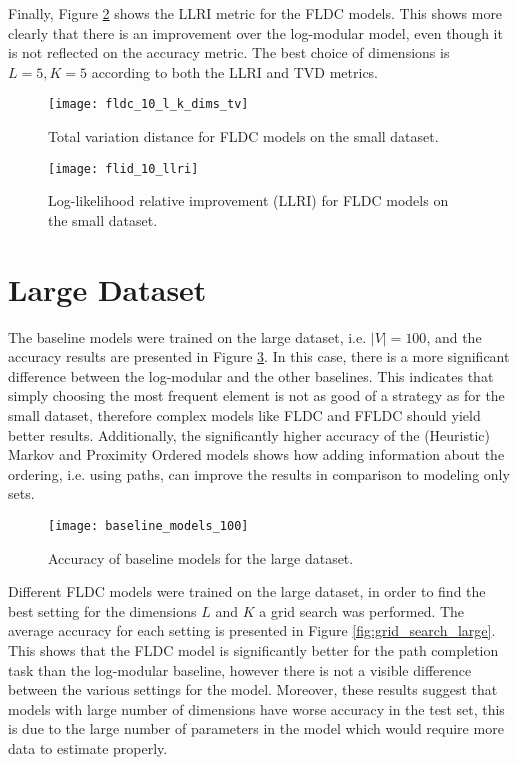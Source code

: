 Finally, Figure \ref{fig:small_llri} shows the LLRI metric for the FLDC models. This shows more clearly that there is an improvement over the log-modular model, even though it is not reflected on the accuracy metric. The best choice of dimensions is $L=5,K=5$ according to both the LLRI and TVD metrics.

\begin{figure}
  \centering
  \texttt{[image: fldc\_10\_l\_k\_dims\_tv]}
  \caption{Total variation distance for FLDC models on the small dataset.}
  \label{fig:small_tv_comparison}
\end{figure}

\begin{figure}
  \centering
  \texttt{[image: flid\_10\_llri]}
  \caption{Log-likelihood relative improvement (LLRI) for FLDC models on the small dataset.}
  \label{fig:small_llri}
\end{figure}

\section{Large Dataset}

The baseline models were trained on the large dataset, i.e. $|V| = 100$, and the accuracy results are presented in Figure \ref{fig:large_baselines}. In this case, there is a more significant difference between the log-modular and the other baselines. This indicates that simply choosing the most frequent element is not as good of a strategy as for the small dataset, therefore complex models like FLDC and FFLDC should yield better results. Additionally, the significantly higher accuracy of the (Heuristic) Markov and Proximity Ordered models shows how adding information about the ordering, i.e. using paths, can improve the results in comparison to modeling only sets.

\begin{figure}
  \centering
  \texttt{[image: baseline\_models\_100]}
  \caption{Accuracy of baseline models for the large dataset.}
  \label{fig:large_baselines}
\end{figure}

Different FLDC models were trained on the large dataset, in order to find the best setting for the dimensions $L$ and $K$ a grid search was performed. The average accuracy for each setting is presented in Figure \ref{fig:grid_search_large}. This shows that the FLDC model is significantly better for the path completion task than the log-modular baseline, however there is not a visible difference between the various settings for the model. Moreover, these results suggest that models with large number of dimensions have worse accuracy in the test set, this is due to the large number of parameters in the model which would require more data to estimate properly.

